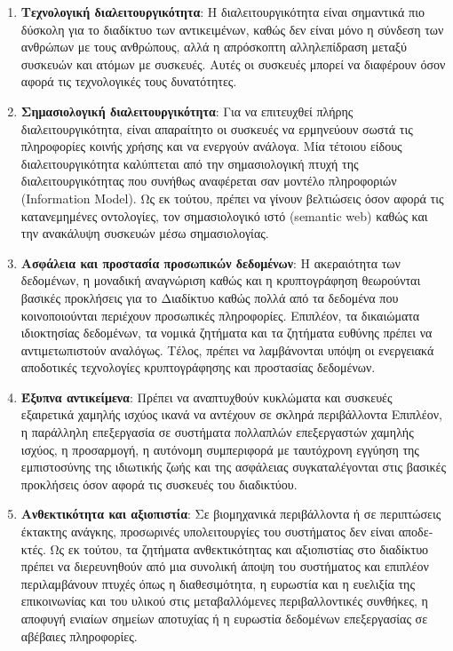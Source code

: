 \begin{enumerate}
	\item{\textbf{Τεχνολογική διαλειτουργικότητα}: Η διαλειτουργικότη­τα είναι σημαντικά πιο δύσκολη για το διαδίκτυο των αντικειμένων, καθώς δεν είναι μόνο η σύνδεση των ανθρώπων με τους ανθρώπους, αλλά η απρόσκοπτη αλληλεπίδραση μεταξύ συσκευών και ατόμων με συσκευές. Αυτές οι συσκευές μπορεί να διαφέρουν όσον αφορά τις τεχνολογικές τους δυνατότητες.}
	\item{\textbf{Σημασιολογική διαλειτουργικότητα}: Για να επιτευχθεί πλήρης διαλειτουργικότητα, είναι απαραίτητο οι συσκευές να ερμηνεύουν σωστά τις πληροφορίες κοινής χρήσης και να ενεργούν ανάλογα. Μία τέτοιου είδους διαλειτουργικότητα καλύπτεται από την σημασιολογι­κή πτυχή της διαλειτουργικότητας που συνήθως αναφέρεται σαν μοντέλο πληροφοριών (Information Model). Ως εκ τούτου, πρέπει να γίνουν βελτιώσεις όσον αφορά τις κατανεμημένες οντολογίες, τον σημα­σιολογικό ιστό (semantic web) καθώς και την ανακάλυ­ψη συσκευών μέσω σημασιολογίας. }
	\item{\textbf{Ασφάλεια και προστασία προσωπικών δεδομένων}: Η ακεραιότητα των δεδομένων, η μοναδική αναγνώριση καθώς και η κρυπτογράφηση θεωρούνται βασικές προκλήσεις για το Διαδίκτυο καθώς πολλά από τα δεδο­μένα που κοινοποιούνται περιέχουν προσωπικές πληροφορίες. Επιπλέον, τα δικαιώματα ιδιοκτησίας δεδο­μένων, τα νομικά ζητήματα και τα ζητήματα ευθύνης πρέπει να αντιμετωπιστούν αναλόγως. Τέλος, πρέπει να λαμβάνονται υπόψη οι ενεργειακά αποδοτικές τε­χνολογίες κρυπτογράφησης και προστασίας δεδομένων. }
	\item{\textbf{Έξυπνα αντικείμενα}: Πρέπει να αναπτυχθούν κυκλώμα­τα και συσκευές εξαιρετικά χαμηλής ισχύος ικανά να αντέχουν σε σκληρά περιβάλλοντα Επιπλέον, η παράλληλη επεξεργασία σε συστήματα πολλαπλών επεξεργαστών χαμηλής ισχύος, η προσαρμογή, η αυτόνομη συμπεριφορά με ταυτόχρονη εγγύηση της εμπιστοσύνης της ιδιωτικής ζωής και της ασφάλειας συγκαταλέγονται στις βασικές προκλήσεις όσον αφορά τις συσκευές του διαδικτύου. }
	\item{\textbf{Ανθεκτικότητα και αξιοπιστία}: Σε βιομηχανικά περιβάλλοντα ή σε περιπτώσεις έκτακτης ανάγκης, προσω­ρινές υπολειτουργίες του συστήματος δεν είναι αποδε­κτές. Ως εκ τούτου, τα ζητήματα ανθεκτικότητας και αξιοπιστίας στο διαδίκτυο πρέπει να διερευνηθούν από μια συνολική άποψη του συστήματος και επιπλέον πε­ριλαμβάνουν πτυχές όπως η διαθεσιμότητα, η ευρωστία και η ευελιξία της επικοινωνίας και του υλικού στις μεταβαλλόμενες περιβαλλοντικές συνθήκες, η αποφυγή ενιαίων σημείων αποτυχίας ή η ευρωστία δεδομένων επεξεργασίας σε αβέβαιες πληροφορίες. }
	
\end{enumerate}

